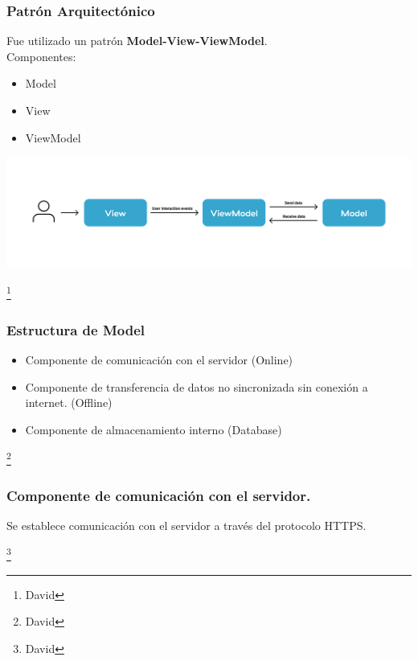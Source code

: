\documentclass[14pt]{beamer}
\begin{document}
\begin{frame}
\frametitle{Patrón Arquitectónico}

Fue utilizado un patrón \textbf{Model-View-ViewModel}.
\\
Componentes:
\begin{itemize}
\item Model
\item View
\item ViewModel
\end{itemize}

\begin{center}

\includegraphics[scale =0.2]{Images/MVVMwip.png}


\end{center}

\footnote{David}
\end{frame}





\begin{frame}
\frametitle{Estructura de Model}



\begin{itemize}
\item Componente de comunicación con el servidor (Online)

\item Componente de transferencia de datos no sincronizada sin conexión a internet. (Offline)

\item Componente de almacenamiento interno (Database)

\end{itemize}

\footnote{David}
\end{frame}

\begin{frame}
\frametitle{Componente de comunicación con el servidor.}

\begin{block}{}
Se establece comunicación con el servidor a través del protocolo HTTPS.
\end{block}
\footnote{David}
\end{frame}
\end{document}
